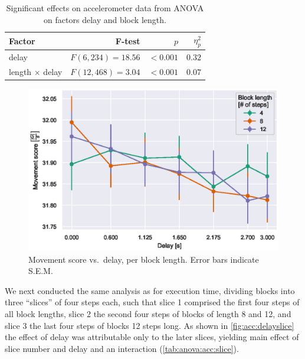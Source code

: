 \documentclass[10pt,letterpaper]{article}
\begin{document}
\begin{table}[h]
  \centering
  \caption{Significant effects on accelerometer data from ANOVA on factors delay and block length.}\label{tab:anova:acc}
  \setlength{\tabcolsep}{0pt} %
  \begin{tabular*}{\columnwidth}{@{\extracolsep{\fill}\quad}lrrr@{}}
    \toprule
    \textbf{Factor} & \textbf{F-test} & \textbf{\(p\)} & \textbf{\(\eta^{2}_{p}\)} \\ 
    \midrule
    delay & \(F(6, 234) = 18.56\) & \(<0.001\) & \(0.32\) \\
    length \( \times \) delay & \(F(12, 468) = 3.04\) & \(<0.001\) & \(0.07\) \\ 
    \bottomrule
  \end{tabular*}%
\end{table}

\begin{figure}[h]
    \centering
    \includegraphics[width=.8\textwidth]{plots/acc_vs_delay_per_length.eps}
    \caption{Movement score vs.\ delay, per block length. Error bars indicate S.E.M.}\label{fig:acc:delaylength}
\end{figure}

We next conducted the same analysis as for execution time, dividing blocks into three ``slices'' of four steps each, such that slice 1 comprised the first four steps of all block lengths, slice 2 the second four steps of blocks of length 8 and 12, and slice 3 the last four steps of blocks 12 steps long.
As shown in \cref{fig:acc:delayslice} the effect of delay was attributable only to the later slices, yielding main effect of slice number and delay and an interaction (\cref{tab:anova:acc:slice}). 
\end{document}
